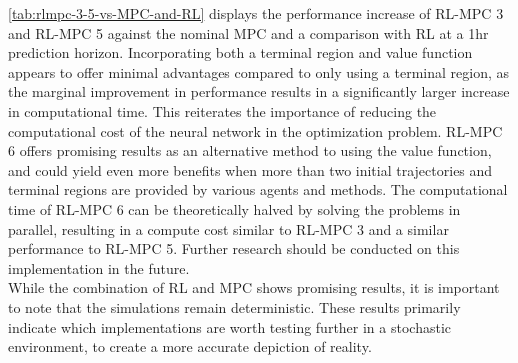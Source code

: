 \autoref{tab:rlmpc-3-5-vs-MPC-and-RL} displays the performance increase of RL-MPC 3 and RL-MPC 5 against the nominal MPC and a comparison with RL at a 1hr prediction horizon. Incorporating both a terminal region and value function  appears to offer minimal advantages compared to only using a terminal region, as the marginal improvement in performance results in a significantly larger increase in computational time. This reiterates the importance of reducing the computational cost of the neural network in the optimization problem. RL-MPC 6 offers promising results as an alternative method to using the value function, and could yield even more benefits when more than two initial trajectories and terminal regions are provided by various agents and methods. The computational time of RL-MPC 6 can be theoretically halved by solving the problems in parallel, resulting in a compute cost similar to RL-MPC 3 and a similar performance to RL-MPC 5. Further research should be conducted on this implementation in the future.\\
While the combination of RL and MPC shows promising results, it is important to note that the simulations remain deterministic. These results primarily indicate which implementations are worth testing further in a stochastic environment, to create a more accurate depiction of reality.



